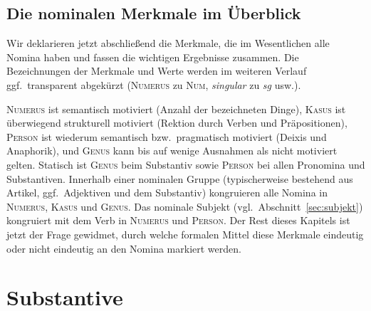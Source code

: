 \subsection{Die nominalen Merkmale im Überblick}

Wir deklarieren jetzt abschließend die Merkmale, die im Wesentlichen alle Nomina haben und fassen die wichtigen Ergebnisse zusammen.
Die Bezeichnungen der Merkmale und Werte werden im weiteren Verlauf ggf.\ transparent abgekürzt (\textsc{Numerus} zu \textsc{Num}, \textit{singular} zu \textit{sg} usw.).

\begin{exe}
\end{exe}

\textsc{Numerus} ist semantisch motiviert (Anzahl der bezeichneten Dinge), \textsc{Kasus} ist überwiegend strukturell motiviert (Rektion durch Verben und Präpositionen), \textsc{Person} ist wiederum semantisch bzw.\ pragmatisch motiviert (Deixis und Anaphorik), und \textsc{Genus} kann bis auf wenige Ausnahmen als nicht motiviert gelten.
Statisch ist \textsc{Genus} beim Substantiv sowie \textsc{Person} bei allen Pronomina und Substantiven.
Innerhalb einer nominalen Gruppe (typischerweise bestehend aus Artikel, ggf.\ Adjektiven und dem Substantiv) kongruieren alle Nomina in \textsc{Numerus}, \textsc{Kasus} und \textsc{Genus}.
Das nominale Subjekt (vgl.\ Abschnitt~\ref{sec:subjekt}) kongruiert mit dem Verb in \textsc{Numerus} und \textsc{Person}.
Der Rest dieses Kapitels ist jetzt der Frage gewidmet, durch welche formalen Mittel diese Merkmale eindeutig oder nicht eindeutig an den Nomina markiert werden.




\section{Substantive}

